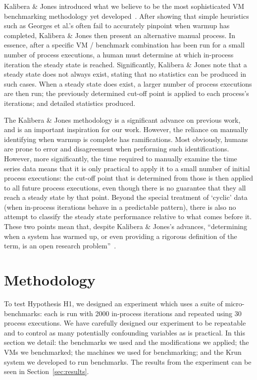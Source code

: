 \documentclass[acmlarge]{acmart}\settopmatter{printfolios=true}
\newcommand{\kalibera}{Kalibera \& Jones\xspace}
\newcommand{\krun}{Krun\xspace}
\begin{document}
\kalibera introduced what we believe to be the most sophisticated VM benchmarking methodology
yet developed~\cite{kalibera12quantifying,kalibera13rigorous}. After
showing that simple heuristics such as Georges et al.'s often fail to accurately
pinpoint when warmup has completed, \kalibera then present an alternative manual
process. In essence, after a specific VM / benchmark combination has been run for a small number of
process executions, a human must determine at which in-process iteration the
steady state is reached. Significantly, \kalibera note that a steady
state does not always exist, stating that no statistics can be produced in
such cases. When a steady state does exist, a larger number of process executions are then
run; the previously determined cut-off point is applied to each process's
iterations; and detailed statistics produced.

The \kalibera methodology is a significant advance on previous work,
and is an important inspiration for our work. However, the reliance
on manually identifying when warmup is complete has ramifications. Most
obviously, humans are prone to error and disagreement when performing
such identifications. However, more significantly, the time required
to manually examine the time series data means that it is only practical to apply it to a small number
of initial process executions: the cut-off point that is determined from those
is then applied to all future process executions, even though there is no
guarantee that they all reach a steady state by that point. Beyond the
special treatment of `cyclic' data (when in-process iterations behave in a
predictable pattern), there is also no attempt to classify the steady state
performance relative to what comes before it. These two points mean that,
despite \kalibera's advances,
``determining when a system has warmed up, or even providing a
rigorous definition of the term, is an open research problem''~\cite{seaton15phd}.


\section{Methodology}
\label{sec:methodology}

To test Hypothesis H1, we designed an experiment which uses a suite of
micro-benchmarks: each is run with 2000 in-process iterations and repeated
using 30 process executions. We have carefully designed our
experiment to be repeatable and to control as many potentially confounding variables as
is practical. In this section we detail: the benchmarks we used and the modifications we
applied; the VMs we benchmarked; the machines we used for benchmarking; and the
\krun system we developed to run benchmarks. The results from the experiment
can be seen in Section~\ref{sec:results}.
\end{document}
